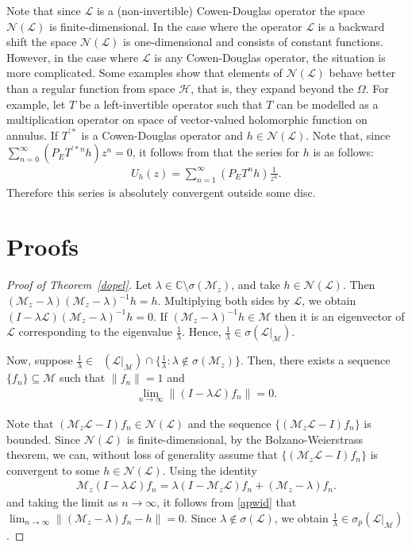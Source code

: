 \documentclass[reqno]{amsproc}
\DeclareMathOperator{\sigmap}{\sigma_{\textrm{ap}}}
\numberwithin{equation}{section}
\theoremstyle{remark}
\newcommand*{\hh}{\mathcal{H}}
\newcommand*{\mcal}{\mathcal{M}}
\newcommand*{\nul}{\mathscr{N}}
\newcommand*{\comp}{\mathbb{C}}
\theoremstyle{definition}
\newcommand{\lein}{\mathcal{L}}
\newcommand{\mul}{\mathcal{M}_z}
\begin{document}
Note that since $\lein$ is a (non-invertible) Cowen-Douglas operator the space  $\nul(\lein)$ is finite-dimensional. In the case where the operator $\lein$ is a backward shift the  space $\nul(\lein)$ is one-dimensional and consists of constant functions. However, in the case where $\lein$ is any Cowen-Douglas operator, the situation is more complicated. Some examples show that elements of $\nul(\lein)$ behave better than a regular function from space $\hh$,  that is, they expand beyond the $\varOmega$. For example, let $T$ be a left-invertible operator such that $T$ can be modelled as a multiplication operator on space of vector-valued holomorphic function on annulus. If $T^{\prime*}$ is a Cowen-Douglas operator and $h\in \nul(\lein)$. 
Note that, since $\sum_{n=0}^\infty (P_E {T^{\prime*n}} h) z^n = 0$, it follows from \cite{ja3} that the series for $h$ is as follows:
\begin{align*}
           U_h(z) =\sum_{n=1}^\infty
(P_ET^{n}h)\frac{1}{z^n}.
\end{align*}
Therefore this series is absolutely convergent outside some disc. 

\section{Proofs}




\begin{proof}[Proof of Theorem~\ref{dopel}]
Let $\lambda\in \comp\setminus\sigma(\mul)$, and 
take $h\in \nul(\lein)$. Then $(\mul-\lambda)(\mul-\lambda)^{-1}h=h$. Multiplying both sides by $\lein$, we obtain $(I-\lambda\lein)(\mul-\lambda)^{-1}h=0$. If $(\mul-\lambda)^{-1}h\in \mcal$  then it is an eigenvector of $\lein$ corresponding to the eigenvalue $\frac{1}{\lambda}$. Hence, $\frac{1}{\lambda}\in \sigma(\lein|_
\mcal)$.

Now, suppose $\frac{1}{\lambda}\in \sigmap(\lein|_\mcal)\cap \{ \frac{1}{\lambda}\colon \lambda \notin \sigma(\mul)\}$. Then, there exists a sequence  $\{f_n\}\subseteq \mcal$ such that $\|f_n\|=1$ and
\begin{align}\label{apwid}
    \lim_{n\to \infty} \|(I -\lambda\lein)f_n\|=0.
\end{align}

Note that $(\mul\lein-I)f_n\in \nul(\lein)$ and the sequence $\{(\mul\lein-I)f_n\}$ is bounded. Since $\nul(\lein)$ is finite-dimensional, by the Bolzano-Weierstrass theorem, we can,  without loss of generality assume that $\{(\mul\lein-I)f_n\}$ is convergent to some $h\in \nul(\lein)$. Using the identity
    \begin{align*}
       \mul(I -\lambda\lein)f_n=\lambda(I-\mul\lein)f_n+(\mul-\lambda)f_n.
    \end{align*}
    and taking the limit as $n\to \infty$, it follows from \eqref{apwid} that $\lim_{n\to\infty} \|(\mul-\lambda)f_n-h\|=0$. Since $\lambda\notin \sigma(\lein)$, we obtain $\frac{1}{\lambda}\in \sigma_{p}(\lein|_\mcal)$.
\end{proof}
\end{document}
